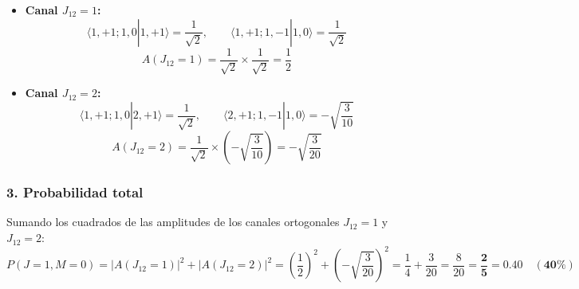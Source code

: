 \begin{problema}
\begin{itemize}
    \item \textbf{Canal $J_{12} = 1$:}
    \begin{equation*}
    \langle 1, +1; 1, 0 | 1, +1 \rangle = \frac{1}{\sqrt{2}}, \qquad \langle 1, +1; 1, -1 | 1, 0 \rangle = \frac{1}{\sqrt{2}}
    \end{equation*}
    \begin{equation*}
    A(J_{12}=1) = \frac{1}{\sqrt{2}} \times \frac{1}{\sqrt{2}} = \frac{1}{2}
    \end{equation*}

    \item \textbf{Canal $J_{12} = 2$:}
    \begin{equation*}
    \langle 1, +1; 1, 0 | 2, +1 \rangle = \frac{1}{\sqrt{2}}, \qquad \langle 2, +1; 1, -1 | 1, 0 \rangle = -\sqrt{\frac{3}{10}}
    \end{equation*}
    \begin{equation*}
    A(J_{12}=2) = \frac{1}{\sqrt{2}} \times \left(-\sqrt{\frac{3}{10}}\right) = -\sqrt{\frac{3}{20}}
    \end{equation*}
\end{itemize}

\subsubsection*{3. Probabilidad total}

Sumando los cuadrados de las amplitudes de los canales ortogonales $J_{12} = 1$ y $J_{12} = 2$:
\begin{equation*}
P(J=1, M=0) = |A(J_{12}=1)|^2 + |A(J_{12}=2)|^2 = \left(\frac{1}{2}\right)^2 + \left(-\sqrt{\frac{3}{20}}\right)^2 = \frac{1}{4} + \frac{3}{20} = \frac{8}{20} = \mathbf{\frac{2}{5} = 0.40 \quad (40\%)}
\end{equation*}
\end{problema}


